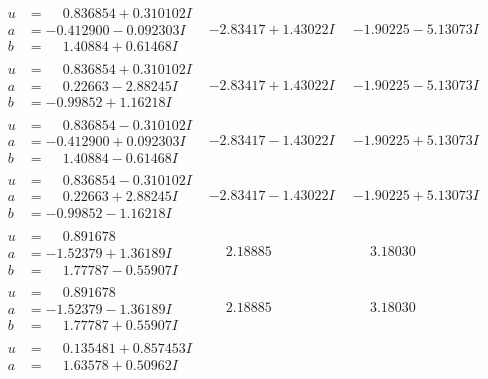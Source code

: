 \documentclass[1p]{elsarticle_modified}
\theoremstyle{definition}
\begin{document}
$$\begin{array}{c|c|c}
\begin{aligned}
u &= \phantom{-}0.836854 + 0.310102 I \\
a &= -0.412900 - 0.092303 I \\
b &= \phantom{-}1.40884 + 0.61468 I\end{aligned}
 & -2.83417 + 1.43022 I & -1.90225 - 5.13073 I \\ \hline\begin{aligned}
u &= \phantom{-}0.836854 + 0.310102 I \\
a &= \phantom{-}0.22663 - 2.88245 I \\
b &= -0.99852 + 1.16218 I\end{aligned}
 & -2.83417 + 1.43022 I & -1.90225 - 5.13073 I \\ \hline\begin{aligned}
u &= \phantom{-}0.836854 - 0.310102 I \\
a &= -0.412900 + 0.092303 I \\
b &= \phantom{-}1.40884 - 0.61468 I\end{aligned}
 & -2.83417 - 1.43022 I & -1.90225 + 5.13073 I \\ \hline\begin{aligned}
u &= \phantom{-}0.836854 - 0.310102 I \\
a &= \phantom{-}0.22663 + 2.88245 I \\
b &= -0.99852 - 1.16218 I\end{aligned}
 & -2.83417 - 1.43022 I & -1.90225 + 5.13073 I \\ \hline\begin{aligned}
u &= \phantom{-}0.891678\phantom{ +0.000000I} \\
a &= -1.52379 + 1.36189 I \\
b &= \phantom{-}1.77787 - 0.55907 I\end{aligned}
 & \phantom{-}2.18885\phantom{ +0.000000I} & \phantom{-}3.18030\phantom{ +0.000000I} \\ \hline\begin{aligned}
u &= \phantom{-}0.891678\phantom{ +0.000000I} \\
a &= -1.52379 - 1.36189 I \\
b &= \phantom{-}1.77787 + 0.55907 I\end{aligned}
 & \phantom{-}2.18885\phantom{ +0.000000I} & \phantom{-}3.18030\phantom{ +0.000000I} \\ \hline\begin{aligned}
u &= \phantom{-}0.135481 + 0.857453 I \\
a &= \phantom{-}1.63578 + 0.50962 I \\

\end{aligned}
\end{array}$$
\end{document}
